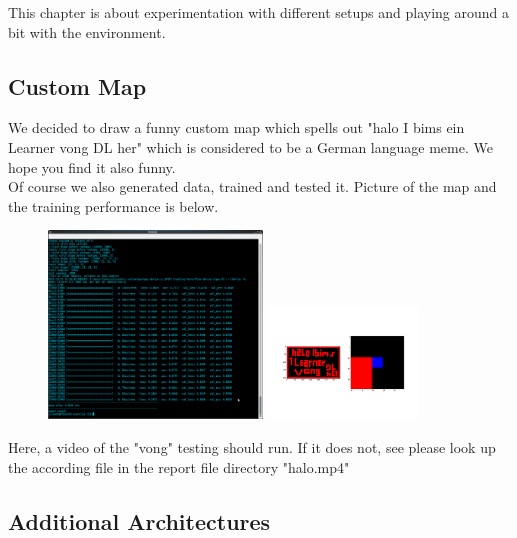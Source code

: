 \documentclass[a4paper]{article}
\begin{document}
This chapter is about experimentation with different setups and playing around a bit with the environment.

\subsection{Custom Map}
We decided to draw a funny custom map which spells out "halo I bims ein Learner vong DL her" which is considered to be a German language meme. We hope you find it also funny.\\
Of course we also generated data, trained and tested it. Picture of the map and the training performance is below.

\begin{figure}[hbpt!]
\includegraphics[height=5cm,width=\textwidth]{vong_training.png}
\includegraphics[height=3cm,width=\textwidth]{vong_training_map.png}


\end{figure}



Here, a video of the "vong" testing should run. If it does not, see please look up the according file in the report file directory "halo.mp4"
\begin{center}

\end{center}

\subsection{Additional Architectures}
\end{document}
